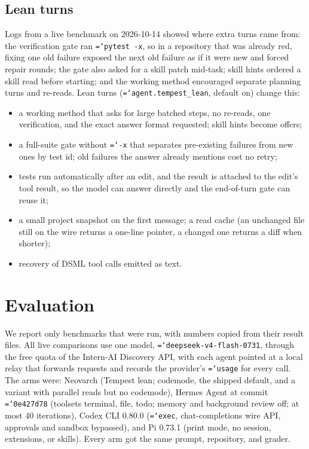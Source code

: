 \documentclass[11pt]{article}
\newcommand{\code}[1]{\texttt{\hyphenchar\font=`\-\relax #1}}
\begin{document}
\subsection{Lean turns}
Logs from a live benchmark on 2026-10-14 showed where extra turns came from: the verification gate ran \code{pytest -x}, so in a repository that was already red, fixing one old failure exposed the next
old failure as if it were new and forced repair rounds; the gate also asked for a skill patch mid-task; skill hints ordered a skill read before starting; and the working method encouraged separate planning
turns and re-reads. Lean turns (\code{agent.tempest\_lean}, default on) change this:
\begin{itemize}
\item a working method that asks for large batched steps, no re-reads, one verification, and the exact answer format requested; skill hints become offers;
\item a full-suite gate without \code{-x} that separates pre-existing failures from new ones by test id; old failures the answer already mentions cost no retry;
\item tests run automatically after an edit, and the result is attached to the edit's tool result, so the model can answer directly and the end-of-turn gate can reuse it;
\item a small project snapshot on the first message; a read cache (an unchanged file still on the wire returns a one-line pointer, a changed one returns a diff when shorter);
\item recovery of DSML tool calls emitted as text.
\end{itemize}

\section{Evaluation}
\label{sec:eval}

We report only benchmarks that were run, with numbers copied from their result files. All live comparisons use one model, \code{deepseek-v4-flash-0731}, through the free quota of the
Intern-AI Discovery API, with each agent pointed at a local relay that forwards requests and records the provider's \code{usage} for every call. The arms were:
Neovarch (Tempest lean; codemode, the shipped default, and a variant with parallel reads but no codemode), Hermes Agent at commit \code{0e427d78} (toolsets terminal, file, todo; memory and background review off; at most 40 iterations),
Codex CLI 0.80.0 (\code{exec}, chat-completions wire API, approvals and sandbox bypassed), and Pi 0.73.1 (print mode, no session, extensions, or skills). Every arm got the same prompt, repository, and grader.
\end{document}
